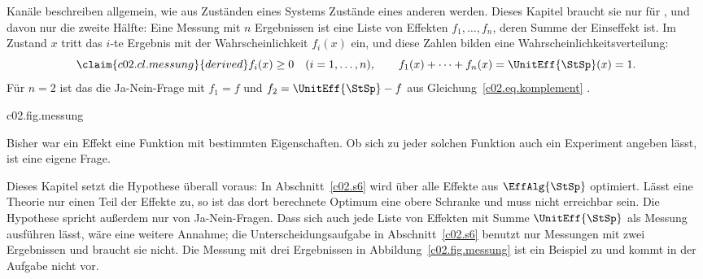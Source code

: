 

Kanäle beschreiben allgemein, wie aus Zuständen eines Systems Zustände eines anderen
werden. Dieses Kapitel braucht sie nur für , und davon nur die zweite Hälfte:
Eine Messung mit $n$ Ergebnissen ist eine Liste von Effekten $f_1, \dots, f_n$, deren Summe
der Einseffekt ist. Im Zustand $x$ tritt das $i$-te Ergebnis mit der Wahrscheinlichkeit
$f_i(x)$ ein, und diese Zahlen bilden eine Wahrscheinlichkeitsverteilung:
\begin{equation}\label{c02.eq.messung}\claim{c02.cl.messung}{derived}
  f_i(x) \geq 0 \quad (i = 1, \dots, n),
  \qquad f_1(x) + \dots + f_n(x) = \UnitEff{\StSp}(x) = 1 .
\end{equation}
Für $n = 2$ ist das die Ja-Nein-Frage mit $f_1 = f$ und $f_2 = \UnitEff{\StSp} - f$ aus
Gleichung~\eqref{c02.eq.komplement}
.

\begin{tpcfigure}{c02.fig.messung}
  \caption{Eine Messung mit drei Ergebnissen auf dem klassischen Bit. Die Effekte sind $f_1 = (\tfrac12, 0)$, $f_2 = (\tfrac12, \tfrac12)$ und $f_3 = (0, \tfrac12)$ in den Koordinaten $(q_0, q_1)$; ihre Summe ist $(1,1) = \UnitEff{\StSp}$. Über jedem Zustand sind die drei Wahrscheinlichkeiten übereinander aufgetragen; zusammen füllen sie die Höhe $1$. Im Zustand $x = (\tfrac34, \tfrac14)$ sind es $\tfrac38$, $\tfrac12$ und $\tfrac18$.}
\end{tpcfigure}

Bisher war ein Effekt eine Funktion mit bestimmten Eigenschaften. Ob sich zu jeder solchen
Funktion auch ein Experiment angeben lässt, ist eine eigene Frage.


Dieses Kapitel setzt die Hypothese überall voraus: In Abschnitt~\ref{c02.s6} wird über
alle Effekte aus $\EffAlg{\StSp}$ optimiert. Lässt eine Theorie nur einen Teil der
Effekte zu, so ist das dort berechnete Optimum eine obere Schranke und muss nicht
erreichbar sein. Die Hypothese spricht außerdem nur von Ja-Nein-Fragen. Dass sich auch jede
Liste von Effekten mit Summe $\UnitEff{\StSp}$ als Messung ausführen lässt, wäre eine
weitere Annahme; die Unterscheidungsaufgabe in Abschnitt~\ref{c02.s6} benutzt nur
Messungen mit zwei Ergebnissen und braucht sie nicht. Die Messung mit drei
Ergebnissen in Abbildung~\ref{c02.fig.messung} ist ein Beispiel zu  und kommt
in der Aufgabe nicht vor.

